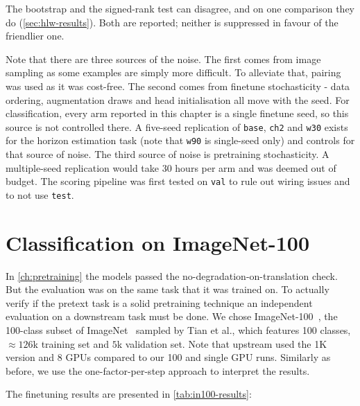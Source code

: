 \documentclass[final_report.tex]{subfiles}
\begin{document}
The bootstrap and the signed-rank test can disagree, and on one comparison they do
(\cref{sec:hlw-results}). Both are reported; neither is suppressed in favour of the
friendlier one.

Note that there are three sources of the noise. The first comes from image sampling as some examples are simply more difficult. To alleviate that, pairing was used as it was cost-free. The second comes from finetune stochasticity - data ordering, augmentation draws and head initialisation all move with the seed. For classification, every arm reported in this chapter is a single finetune seed, so this source is not controlled there. A five-seed replication of \texttt{base}, \texttt{ch2} and \texttt{w30} exists for the horizon estimation task (note that \texttt{w90} is single-seed only) and controls for that source of noise. The third source of noise is pretraining stochasticity. A multiple-seed replication would take 30 hours per arm and was deemed out of budget. The scoring pipeline was first tested on \texttt{val} to rule out wiring issues and to not use \texttt{test}.

\section{Classification on ImageNet-100}\label{sec:in100}
In \cref{ch:pretraining} the models passed the no-degradation-on-translation check. But the evaluation was on the same task that it was trained on. To actually verify if the pretext task is a solid pretraining technique an independent evaluation on a downstream task must be done. We chose ImageNet-100~\cite{cmc}, the 100-class subset of ImageNet~\cite{imagenet} sampled by Tian et al., which features 100 classes, $\approx126$k training set and $5$k validation set. Note that upstream used the 1K version and 8 GPUs compared to our 100 and single GPU runs. Similarly as before, we use the one-factor-per-step approach to interpret the results.

The finetuning results are presented in \cref{tab:in100-results}:
\end{document}
